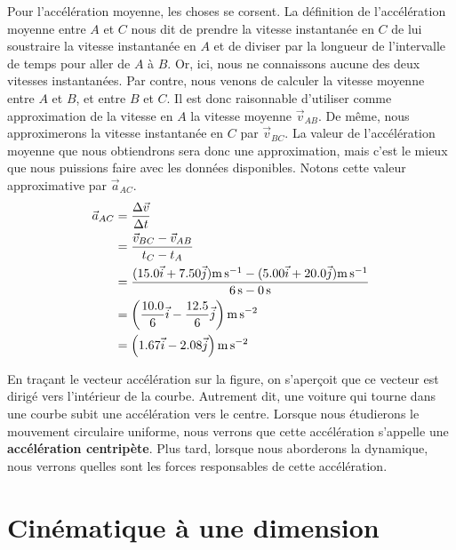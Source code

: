 {  Pour l'accélération moyenne, les choses se corsent.  La définition de
  l'accélération moyenne entre $A$ et $C$ nous dit de prendre la vitesse
  instantanée en $C$ de lui soustraire la vitesse instantanée en $A$ et de
  diviser par la longueur de l'intervalle de temps pour aller de $A$ à $B$.
  Or, ici, nous ne connaissons aucune des deux vitesses instantanées.  Par
  contre, nous venons de calculer la vitesse moyenne entre $A$ et $B$, et entre
  $B$ et $C$.  Il est donc raisonnable d'utiliser comme approximation de la
  vitesse en $A$ la vitesse moyenne $\vec{v}_{AB}$.  De même, nous
  approximerons la vitesse instantanée en $C$ par $\vec{v}_{BC}$.  La valeur
  de l'accélération moyenne que nous obtiendrons sera donc une approximation,
  mais c'est le mieux que nous puissions faire avec les données disponibles.
  Notons cette valeur approximative par $\vec{a}_{AC}$.
  \begin{align*}
    \vec{a}_{AC} &= \frac{\Delta \vec{v}}{\Delta t} \\
                 &= \frac{\vec{v}_{BC} - \vec{v}_{AB}}{t_C - t_A} \\
                 &= \frac{(\num{15.0}\vec{i} + \num{7.50}\vec{j}) \si{\meter\per\second}
                        - (\num{5.00}\vec{i} + \num{20.0}\vec{j}) \si{\meter\per\second}}
                         {\SI{6}{\second} - \SI{0}{\second}} \\
                 &= \left(
                      \frac{\num{10.0}}{6} \vec{i} -
                      \frac{\num{12.5}}{\num{6}}\vec{j}
                    \right) \si{\meter\per\second\squared} \\
                 &= \left(\num{1.67}\vec{i} - \num{2.08}\vec{j}\right) \si{\meter\per\second\squared}
  \end{align*}

  En traçant le vecteur accélération sur la figure, on s'aperçoit que ce
  vecteur est dirigé vers l'intérieur de la courbe.  Autrement dit, une voiture
  qui tourne dans une courbe subit une accélération vers le centre.  Lorsque
  nous étudierons le mouvement circulaire uniforme, nous verrons que cette
  accélération s'appelle une \textbf{accélération centripète}.  Plus tard,
  lorsque nous aborderons la dynamique, nous verrons quelles sont les forces
  responsables de cette accélération.
}


\section{Cinématique à une dimension}

